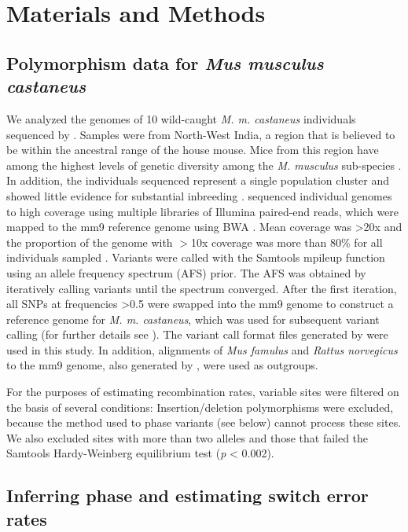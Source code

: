 \section{Materials and Methods}

\subsection{Polymorphism data for \emph{Mus musculus castaneus}}
 
        	We analyzed the genomes of 10 wild-caught \emph{M. m. castaneus} individuals sequenced by \cite{RN122}. Samples were from North-West India, a region that is believed to be within the ancestral range of the house mouse. Mice from this region have among the highest levels of genetic diversity among the \textit{M. musculus} sub-species \citep{RN233}. In addition, the individuals sequenced represent a single population cluster and showed little evidence for substantial inbreeding \cite{RN158}. \citep{RN122} sequenced individual genomes to high coverage using multiple libraries of Illumina paired-end reads, which were mapped to the mm9 reference genome using BWA \citep{RN251}. Mean coverage was >20x and the proportion of the genome with $>$10x coverage was more than 80\% for all individuals sampled \citep{RN122}. Variants were called with the Samtools mpileup function \citep{RN252} using an allele frequency spectrum (AFS) prior. The AFS was obtained by iteratively calling variants until the spectrum converged. After the first iteration, all SNPs at frequencies >0.5 were swapped into the mm9 genome to construct a reference genome for \emph{M. m. castaneus}, which was used for subsequent variant calling (for further details see \citealt{RN122}). The variant call format files generated by \cite{RN122} were used in this study. In addition, alignments of \emph{Mus famulus} and \emph{Rattus norvegicus} to the mm9 genome, also generated by \cite{RN122}, were used as outgroups.
 
        	For the purposes of estimating recombination rates, variable sites were filtered on the basis of several conditions: Insertion/deletion polymorphisms were excluded, because the method used to phase variants (see below) cannot process these sites. We also excluded sites with more than two alleles and those that failed the Samtools Hardy-Weinberg equilibrium test (\emph{p} < 0.002).
 
\subsection{Inferring phase and estimating switch error rates}
 
